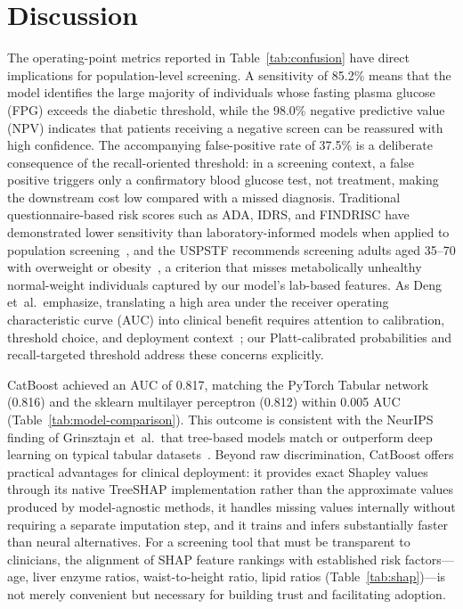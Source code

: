 \section{Discussion}
\label{sec:discussion}

The operating-point metrics reported in Table~\ref{tab:confusion} have direct implications for population-level screening.
A sensitivity of 85.2\% means that the model identifies the large majority of individuals whose fasting plasma glucose (FPG) exceeds the diabetic threshold, while the 98.0\% negative predictive value (NPV) indicates that patients receiving a negative screen can be reassured with high confidence.
The accompanying false-positive rate of 37.5\% is a deliberate consequence of the recall-oriented threshold: in a screening context, a false positive triggers only a confirmatory blood glucose test, not treatment, making the downstream cost low compared with a missed diagnosis.
Traditional questionnaire-based risk scores such as ADA, IDRS, and FINDRISC have demonstrated lower sensitivity than laboratory-informed models when applied to population screening~\cite{Doddamani2021comparative}, and the USPSTF recommends screening adults aged 35--70 with overweight or obesity~\cite{USPSTF2021screening}, a criterion that misses metabolically unhealthy normal-weight individuals captured by our model's lab-based features.
As Deng et~al.\ emphasize, translating a high area under the receiver operating characteristic curve (AUC) into clinical benefit requires attention to calibration, threshold choice, and deployment context~\cite{Deng2025highauc}; our Platt-calibrated probabilities and recall-targeted threshold address these concerns explicitly.

CatBoost achieved an AUC of 0.817, matching the PyTorch Tabular network (0.816) and the sklearn multilayer perceptron (0.812) within 0.005 AUC (Table~\ref{tab:model-comparison}).
This outcome is consistent with the NeurIPS finding of Grinsztajn et~al.\ that tree-based models match or outperform deep learning on typical tabular datasets~\cite{Grinsztajn2022trees}.
Beyond raw discrimination, CatBoost offers practical advantages for clinical deployment: it provides exact Shapley values through its native TreeSHAP implementation rather than the approximate values produced by model-agnostic methods, it handles missing values internally without requiring a separate imputation step, and it trains and infers substantially faster than neural alternatives.
For a screening tool that must be transparent to clinicians, the alignment of SHAP feature rankings with established risk factors---age, liver enzyme ratios, waist-to-height ratio, lipid ratios (Table~\ref{tab:shap})---is not merely convenient but necessary for building trust and facilitating adoption.

